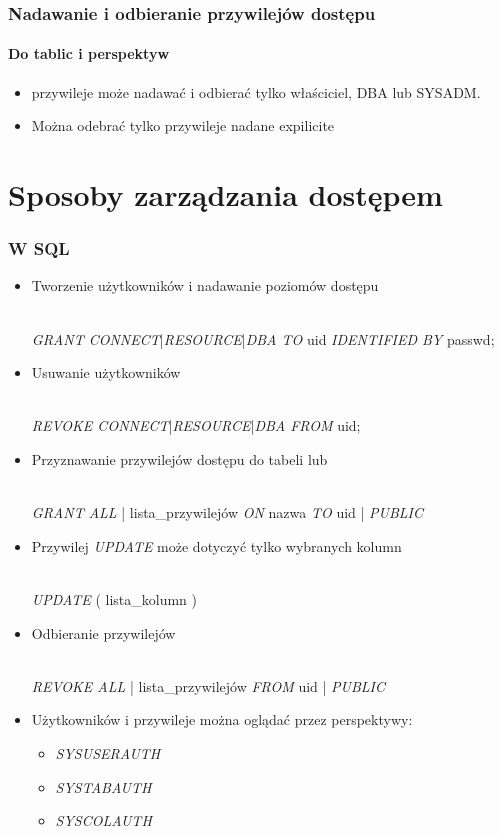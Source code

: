 \documentclass[a4paper,twoside]{article}
\begin{document}
  	\section*{Nadawanie i odbieranie przywilejów dostępu}
  	\subsection*{Do tablic i perspektyw}
  	\begin{itemize}
  		\item przywileje może nadawać i odbierać tylko właściciel, DBA lub SYSADM.
  		\item Można odebrać tylko przywileje nadane expilicite
  	\end{itemize}
  	
  	
  	\part*{Sposoby zarządzania dostępem}
  	
  	\section*{W SQL}
  	\begin{itemize}
  		\item Tworzenie użytkowników i nadawanie poziomów dostępu\\\\
  		\centerline{\emph{GRANT CONNECT}|\emph{RESOURCE}|\emph{DBA TO} uid \emph{IDENTIFIED BY} passwd;}
  		\item Usuwanie użytkowników\\\\ \centerline{\emph{REVOKE CONNECT}|\emph{RESOURCE}|\emph{DBA FROM} uid;}
  		\item Przyznawanie przywilejów dostępu do tabeli lub\\\\ \centerline{\emph{GRANT ALL} | lista\_przywilejów \emph{ON} nazwa \emph{TO} uid | \emph{PUBLIC} }
  		\item Przywilej \emph{UPDATE} może dotyczyć tylko wybranych kolumn\\\\ \centerline{\emph{UPDATE} ( lista\_kolumn ) }
  		\item Odbieranie przywilejów\\\\ \centerline{\emph{REVOKE ALL} | lista\_przywilejów \emph{FROM} uid | \emph{PUBLIC}}
  		\item Użytkowników i przywileje można oglądać przez perspektywy:
  		\begin{itemize}
  			\item \emph{SYSUSERAUTH}
  			\item \emph{SYSTABAUTH}
  			\item \emph{SYSCOLAUTH}
  		\end{itemize}
  	\end{itemize}
  	
\end{document}
